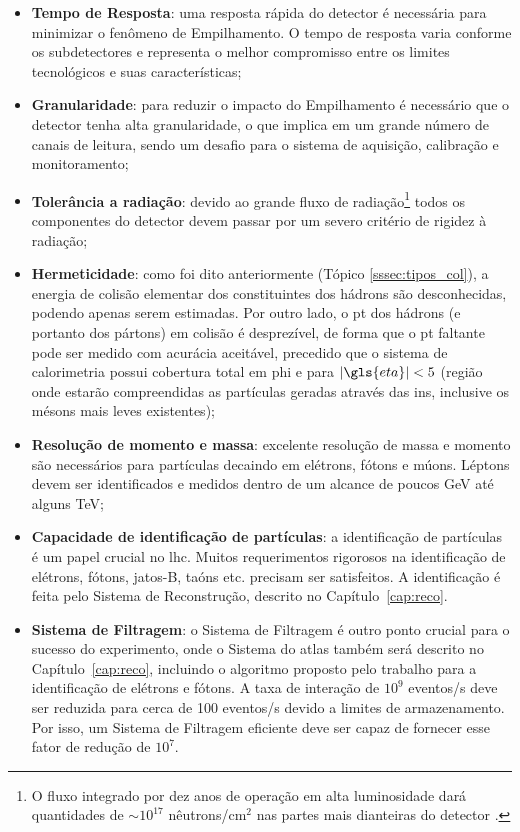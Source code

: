 \begin{itemize}
\item \textbf{Tempo de Resposta}: uma resposta rápida do detector é necessária
para minimizar o fenômeno de Empilhamento. O tempo de resposta varia conforme os
subdetectores e representa o melhor compromisso entre os limites tecnológicos e
suas características;
\item \textbf{Granularidade}: para reduzir o impacto do Empilhamento é
necessário que o detector tenha alta granularidade, o que implica em um grande
número de canais de leitura, sendo um desafio para o sistema de aquisição,
calibração e monitoramento;
\item \textbf{Tolerância a radiação}: devido ao grande fluxo de
radiação\footnote{O fluxo integrado por dez anos de operação em alta
luminosidade dará quantidades de $\sim 10^{17}$ nêutrons/$\text{cm}^2$ nas partes 
mais dianteiras do detector \cite{THESIS_LAR}.} todos os componentes do detector devem passar por 
um severo critério de rigidez à radiação;
\item \textbf{Hermeticidade}: como foi dito anteriormente (Tópico
\ref{sssec:tipos_col}), a energia de colisão elementar dos 
constituintes dos hádrons são desconhecidas, podendo apenas serem estimadas. 
Por outro lado, o \gls{pt} dos hádrons (e portanto dos pártons) 
em colisão é desprezível, de forma que o \acrlong{pt}
faltante pode ser medido com acurácia aceitável, precedido que o sistema de
calorimetria possui cobertura total em \gls{phi} e para $|\gls{eta}|<5$
(região onde estarão compreendidas as partículas geradas através das \glspl{in}, 
inclusive os mésons mais leves existentes);
\item \textbf{Resolução de momento e massa}: excelente resolução de massa e
momento são necessários para partículas decaindo em elétrons, fótons e múons.
Léptons devem ser identificados e medidos dentro de um alcance de poucos GeV até
alguns TeV;
\item \textbf{Capacidade de identificação de partículas}: a identificação de
partículas é um papel crucial no \gls{lhc}. Muitos requerimentos rigorosos na
identificação de elétrons, fótons, jatos-B, taóns etc. precisam ser satisfeitos.
A identificação é feita pelo Sistema de Reconstrução, descrito no
Capítulo~\ref{cap:reco}.
\item \textbf{Sistema de Filtragem}: o Sistema de Filtragem é outro ponto
crucial para o sucesso do experimento, onde o Sistema do \gls{atlas} também 
será descrito no Capítulo~\ref{cap:reco}, incluindo o algoritmo proposto pelo trabalho para a
identificação de elétrons e fótons. 
A taxa de interação de $10^9$ eventos/s deve ser reduzida para cerca de 
100 eventos/s devido a limites de armazenamento.
Por isso, um Sistema de Filtragem eficiente deve ser capaz de fornecer esse
fator de redução de $10^7$.  
\end{itemize}

